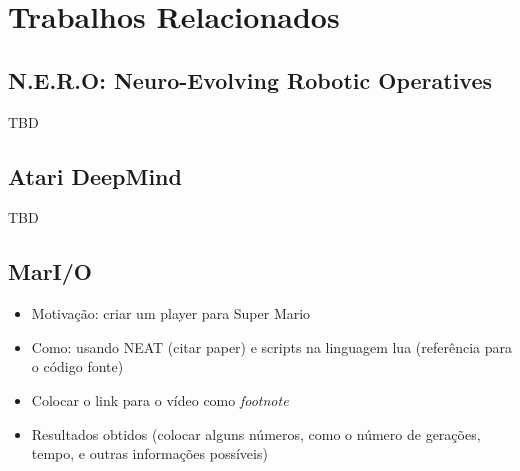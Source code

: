 \chapter{\label{chap:related-work}Trabalhos Relacionados}



\section{N.E.R.O: Neuro-Evolving Robotic Operatives}

TBD

\section{Atari DeepMind}

TBD

\section{MarI/O}

\begin{itemize}
    \item
        Motivação: criar um player para Super Mario
    \item
        Como: usando NEAT (citar paper) e scripts na linguagem lua (referência
        para o código fonte)
    \item 
        Colocar o link para o vídeo como \textit{footnote}
    \item
        Resultados obtidos (colocar alguns números, como o número de gerações,
        tempo, e outras informações possíveis)
\end{itemize}
